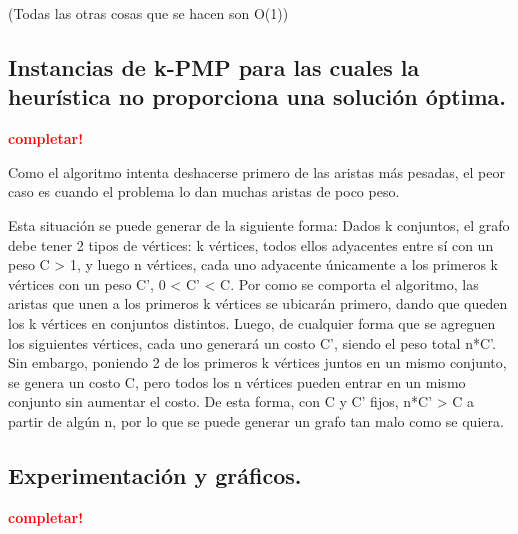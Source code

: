 (Todas las otras cosas que se hacen son O(1))



\newpage
\subsection{Instancias de k-PMP para las cuales la heurística no proporciona
            una solución óptima.}
\vspace*{0.3cm}
\textcolor{red}{\textbf{completar!}}

Como el algoritmo intenta deshacerse primero de las aristas más pesadas, el peor caso es cuando el problema lo dan muchas aristas de poco peso.

Esta situación se puede generar de la siguiente forma:
Dados k conjuntos, el grafo debe tener 2 tipos de vértices: k vértices, todos ellos adyacentes entre sí con un peso C > 1, y luego n vértices, cada uno adyacente únicamente a los primeros k vértices con un peso C', 0 < C' < C.
Por como se comporta el algoritmo, las aristas que unen a los primeros k vértices se ubicarán primero, dando que queden los k vértices en conjuntos distintos.
Luego, de cualquier forma que se agreguen los siguientes vértices, cada uno generará un costo  C', siendo el peso total n*C'.
Sin embargo, poniendo 2 de los primeros k vértices juntos en un mismo conjunto, se genera un costo C, pero todos los n vértices pueden entrar en un mismo conjunto sin aumentar el costo.
De esta forma, con C y C' fijos, n*C' > C a partir de algún n, por lo que se puede generar un grafo tan malo como se quiera.


\newpage
\subsection{Experimentación y gráficos.}
\vspace*{0.3cm}
\textcolor{red}{\textbf{completar!}}
